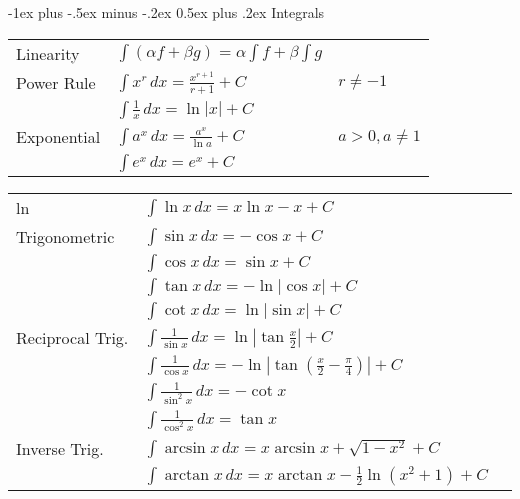 \documentclass[a4paper,12pt]{article}
\makeatletter
\renewcommand{\section}{\@startsection{section}{1}{0mm}%
                                {-1ex plus -.5ex minus -.2ex}%
                                {0.5ex plus .2ex}%
                                {\normalfont\large\bfseries}}
\makeatother
\begin{document}
\begin{multicols}{2}

\setlength{\premulticols}{1pt}
\setlength{\postmulticols}{1pt}
\setlength{\multicolsep}{1pt}
\setlength{\columnsep}{1pt}

\section{Integrals}
\begin{tabular}{@{}ll@{}l@{}}
Linearity & $\int (\alpha f+\beta g)=\alpha\int f +\beta \int g$ \\
Power Rule & $\int x^r \, dx=\frac{x^{r+1}}{r+1}+C$ & $r\neq -1$ \\
& $\int \frac{1}{x} \, dx=\ln|x|+C$ & \\
Exponential & $\int a^x \, dx=\frac{a^x}{\ln a}+C$ & $a>0, a\neq 1$ \\
& $\int e^x \, dx=e^x+C$ & \\

\end{tabular}


\begin{tabular}{@{}ll@{}l@{}}


ln & $\int \ln x \, dx=x\ln x-x+C$ \\


Trigonometric & $\int \sin x \, dx=-\cos x+C$ \\
& $\int \cos x \, dx=\sin x+C$ \\
& $\int \tan x \, dx=-\ln|\cos x|+C$ \\
& $\int \cot x \, dx=\ln|\sin x|+C$ \\
Reciprocal Trig. & $\displaystyle\int \frac{1}{\sin x} \, dx=\ln\left|\tan \frac{x}{2}\right|+C$ \\
& $\displaystyle\int \frac{1}{\cos x} \, dx=-\ln\left|\tan \left( \frac{x}{2}-\frac{\pi}{4} \right)\right|+C$ \\
& $\displaystyle\int \frac{1}{\sin^2x} \, dx=-\cot x$ \\
& $\displaystyle\int \frac{1}{\cos^2x} \, dx=\tan x$ \\

Inverse Trig. &  $\displaystyle\int \arcsin x \, dx=x\arcsin x+\sqrt{ 1-x^2 }+C$ \\	

& $\displaystyle\int \arctan x \, dx=x\arctan x-\frac{1}{2}\ln(x^2+1)+C$ \\
 

\end{tabular}
\end{multicols}
\end{document}
